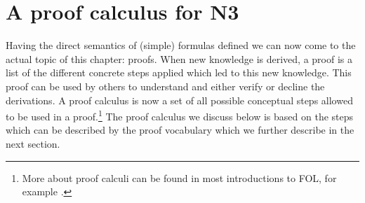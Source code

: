 





\section{A proof calculus for N3}\label{cal}
\label{sec:ProofAnatomy}
Having the direct semantics of (simple) \nthree formulas defined we can now come to the actual topic of this chapter: proofs. When new knowledge is derived,
a proof is a list of the different concrete steps 
 applied which led to this new knowledge. This proof can be used by others to understand and either verify or decline the derivations. A proof calculus is now a set of all 
possible conceptual steps allowed to be used in a proof.\footnote{More about proof calculi can be found in most introductions to FOL, for example \cite{ebbinghaus,enderton,mendelson}.}
The proof calculus we discuss below is based on the steps which can be described by the \nthree proof vocabulary which we further describe in the next section.
% 
% 

